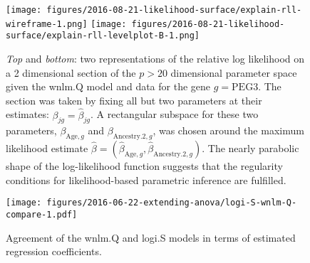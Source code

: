 \documentclass[12pt,letterpaper]{article}
\begin{document}
\begin{figure}[h]
\begin{center}
\texttt{[image: figures/2016-08-21-likelihood-surface/explain-rll-wireframe-1.png]}
\texttt{[image: figures/2016-08-21-likelihood-surface/explain-rll-levelplot-B-1.png]}
\end{center}
\caption{
\emph{Top} and \emph{bottom}: two representations of the relative log
likelihood on a 2 dimensional section of the \(p>20\) dimensional parameter
space given the wnlm.Q model and data for the gene \(g=\mathrm{PEG3}\).  The
section was taken by fixing all but two parameters at their estimates:
\(\beta_{jg} = \hat{\beta}_{jg}\).  A rectangular subspace for these two
parameters, \(\beta_{\mathrm{Age},g}\) and  \(\beta_{\mathrm{Ancestry.2},g}\),
was chosen around the maximum likelihood estimate \(\hat{\beta} =
(\hat{\beta}_{\mathrm{Age},g}, \hat{\beta}_{\mathrm{Ancestry.2},g})\).  The
nearly parabolic shape of the log-likelihood function suggests that the
regularity conditions for likelihood-based parametric inference are fulfilled.
}
\label{fig:ll-surf-explain}
\end{figure}

\begin{figure}[h]
\begin{center}
\texttt{[image: figures/2016-06-22-extending-anova/logi-S-wnlm-Q-compare-1.pdf]}
\end{center}
\caption{
Agreement of the wnlm.Q and logi.S models in terms of estimated regression
coefficients.
}
\label{fig:logi.S-wnlm.Q-compare}
\end{figure}
\end{document}
